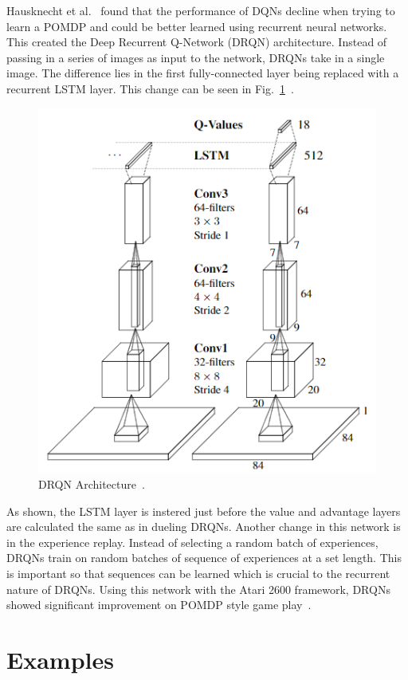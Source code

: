 \documentclass[12pt,american]{report}
\begin{document}
Hausknecht et al.~\cite{HausknechtDRQN} found that the performance of DQNs decline when trying to learn a POMDP and could be better learned using recurrent neural networks. This created the Deep Recurrent Q-Network (DRQN) architecture. Instead of passing in a series of images as input to the network, DRQNs take in a single image. The difference lies in the first fully-connected layer being replaced with a recurrent LSTM layer. This change can be seen in Fig.~\ref{fig:drqn-arch}~\cite{HausknechtDRQN}.

\begin{figure}
\centering
\includegraphics[scale=.85]{images/drqn-arch.png}
\caption{DRQN Architecture~\cite{HausknechtDRQN}.}
\label{fig:drqn-arch}
\end{figure}

As shown, the LSTM layer is instered just before the value and advantage layers are calculated the same as in dueling DRQNs. Another change in this network is in the experience replay.  Instead of selecting a random batch of experiences, DRQNs train on random batches of sequence of experiences at a set length.  This is important so that sequences can be learned which is crucial to the recurrent nature of DRQNs. Using this network with the Atari 2600 framework, DRQNs showed significant improvement on POMDP style game play~\cite{HausknechtDRQN}. 


\section{Examples}
\end{document}
